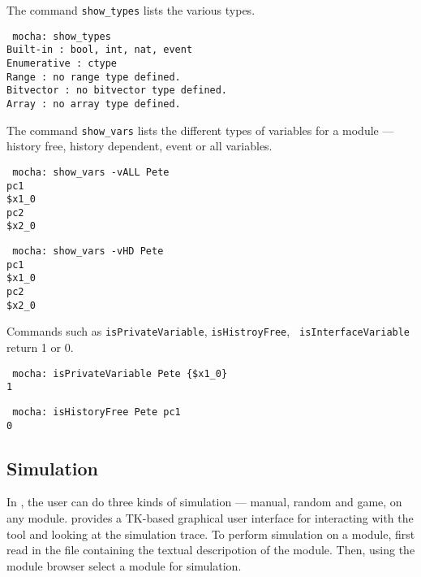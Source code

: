 The command {\tt show\_types} lists the various types.

\mypar
{\tt
mocha: show\_types \\
Built-in    : bool, int, nat, event \\
Enumerative : ctype \\
Range       : no range type defined. \\
Bitvector   : no bitvector type defined. \\
Array       : no array type defined. \\
}

The command {\tt show\_vars} lists the different types of variables for
a module --- history free, history dependent, event or all variables.

\mypar
{\tt
mocha: show\_vars -vALL Pete \\
pc1 \\
\$x1\_0 \\
pc2 \\
\$x2\_0 \\
}

\mypar
{\tt 
mocha: show\_vars -vHD Pete \\
pc1 \\
\$x1\_0 \\
pc2 \\ 
\$x2\_0 \\
}

Commands such as {\tt isPrivateVariable}, {\tt isHistroyFree}, {\tt
isInterfaceVariable} return 1 or 0.

\mypar
{\tt
mocha: isPrivateVariable Pete \{\$x1\_0\} \\
1
}

\mypar
{\tt
mocha: isHistoryFree Pete pc1 \\
0 \\
}

\subsection{Simulation}
In \mocha, the user can do three kinds of simulation --- manual,
random and game, on any module. \mocha provides a TK-based graphical
user interface for interacting with the tool and looking at the
simulation trace. To perform simulation on a module, first read in the
file containing the textual descripotion of the module. Then, using
the module browser select a module for simulation. 


